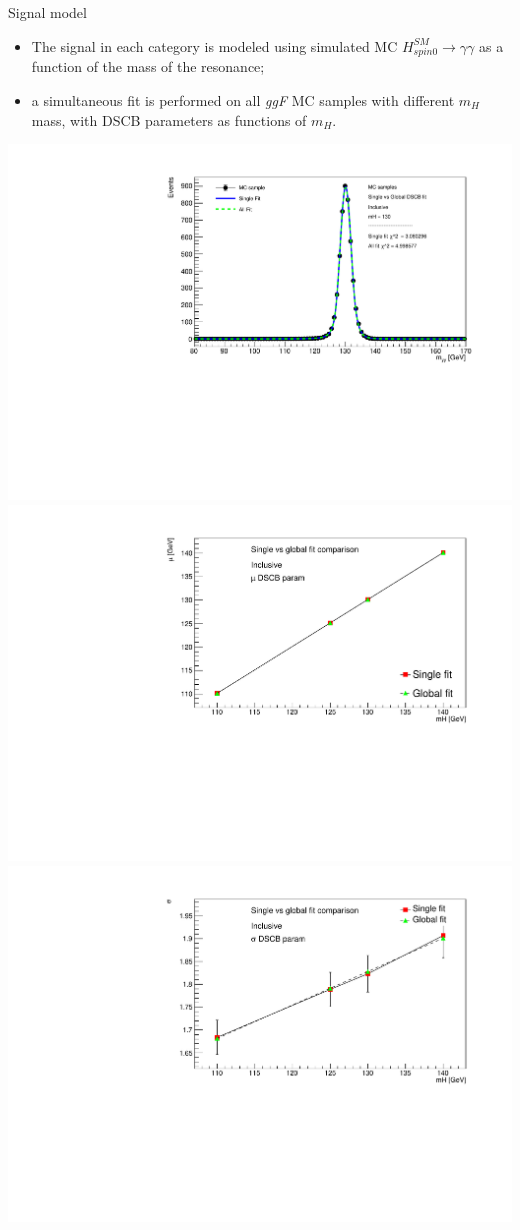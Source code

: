 \documentclass[10pt,UKenglish, leqno, xcolor = dvipsnames]{beamer}
\begin{document}
	\begin{frame}{Signal model}
		\vfill
		\begin{itemize}
			\item The signal in each category is modeled using simulated MC $H^{SM}_{spin0}\to\gamma\gamma$ as a function of the mass of the resonance;
			\item a simultaneous fit is performed on all \textit{ggF} MC samples with different $m_H$ mass, with DSCB parameters as functions of $m_H$.
		\end{itemize}
		\centering
		\includegraphics[width=.4\textwidth]{Pres_Images/comp_plot_130GeV.pdf}
		\includegraphics[width=.4\textwidth]{Pres_Images/mu_comp.pdf}\\
		\includegraphics[width=.4\textwidth]{Pres_Images/sigma_comp.pdf}\\
		\vfill
	\end{frame}
\end{document}
